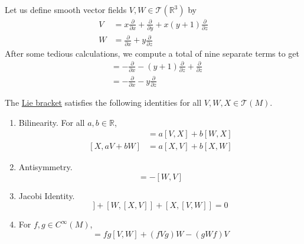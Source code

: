 \documentclass{article}
\newcounter{example}[section]
\begin{document}
    \begin{example}
      \label{ex:computing-a-lie-bracket-on-r3}
      Let us define smooth vector fields $V, W \in \mathcal{T}(\mathbb{R}^3)$ by 
      \begin{align*}
        V & = x \frac{\partial}{\partial x} + \frac{\partial}{\partial y} + x (y+1) \frac{\partial}{\partial z} \\
        W & = \frac{\partial}{\partial x} + y \frac{\partial}{\partial z}
      \end{align*}
      After some tedious calculations, we compute a total of nine separate terms to get 
      \begin{align*}
        [V, W] & = - \frac{\partial}{\partial x} - (y+1) \frac{\partial}{\partial z} + \frac{\partial}{\partial z} \\
        & = - \frac{\partial}{\partial x} - y \frac{\partial}{\partial z} 
      \end{align*}
    \end{example}

    \begin{lemma}
      \label{thm:properties-of-the-lie-bracket}
      The \hyperref[def:lie-bracket]{Lie bracket} satisfies the following identities for all $V, W, X \in \mathcal{T}(M)$. 
      \begin{enumerate}
        \item Bilinearity. For all $a, b \in \mathbb{R}$, 
        \begin{align*}
            [a V + b W, X] & = a [V, X] + b [W, X] \\
            [X, a V + b W] & = a [X, V] + b [X, W]
        \end{align*}

        \item Antisymmetry.
        \begin{equation}
          [V, W] = - [W, V]
        \end{equation}

        \item Jacobi Identity. 
        \begin{equation}
          [V,[W,X]] + [W,[X,V]] + [X,[V,W]] = 0
        \end{equation}

        \item For $f, g \in C^\infty (M)$, 
        \begin{equation}
          [f V, g W] = f g [V, W] + ( fVg) W - (gWf) V
        \end{equation}
      \end{enumerate}
    \end{lemma}
\end{document}
